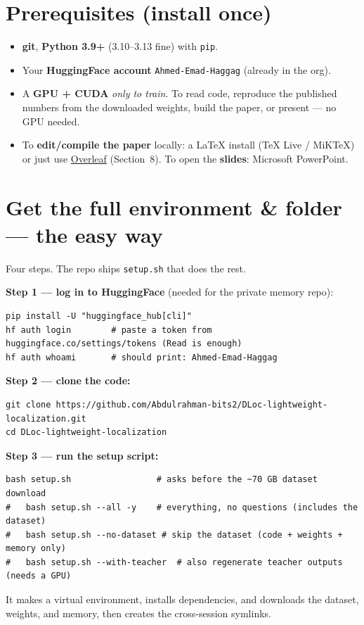 \documentclass[11pt]{article}
\begin{document}
\section{Prerequisites (install once)}
\begin{itemize}[nosep,leftmargin=1.4em]
\item \textbf{git}, \textbf{Python 3.9+} (3.10--3.13 fine) with \texttt{pip}.
\item Your \textbf{HuggingFace account} \texttt{Ahmed-Emad-Haggag} (already in the org).
\item A \textbf{GPU + CUDA} \emph{only to train}. To read code, reproduce the published
      numbers from the downloaded weights, build the paper, or present --- no GPU needed.
\item To \textbf{edit/compile the paper} locally: a LaTeX install (TeX Live / MiKTeX)
      or just use \href{https://overleaf.com}{Overleaf} (Section~8). To open the
      \textbf{slides}: Microsoft PowerPoint.
\end{itemize}

\section{Get the full environment \& folder --- the easy way}
Four steps. The repo ships \texttt{setup.sh} that does the rest.

\textbf{Step 1 --- log in to HuggingFace} (needed for the private memory repo):
\begin{lstlisting}
pip install -U "huggingface_hub[cli]"
hf auth login        # paste a token from huggingface.co/settings/tokens (Read is enough)
hf auth whoami       # should print: Ahmed-Emad-Haggag
\end{lstlisting}

\textbf{Step 2 --- clone the code:}
\begin{lstlisting}
git clone https://github.com/Abdulrahman-bits2/DLoc-lightweight-localization.git
cd DLoc-lightweight-localization
\end{lstlisting}

\textbf{Step 3 --- run the setup script:}
\begin{lstlisting}
bash setup.sh                 # asks before the ~70 GB dataset download
#   bash setup.sh --all -y    # everything, no questions (includes the dataset)
#   bash setup.sh --no-dataset # skip the dataset (code + weights + memory only)
#   bash setup.sh --with-teacher  # also regenerate teacher outputs (needs a GPU)
\end{lstlisting}
It makes a virtual environment, installs dependencies, and downloads the dataset,
weights, and memory, then creates the cross-session symlinks.
\end{document}
